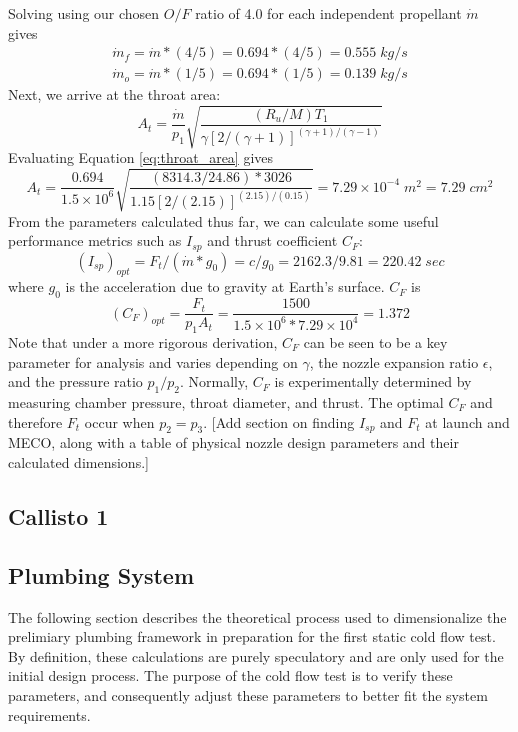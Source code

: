 \documentclass[9pt]{article} %
\numberwithin{equation}{section} %
\begin{document}
Solving using our chosen $O/F$ ratio of 4.0 for each independent propellant $\dot{m}$ gives
\begin{align*} 
\dot{m}_{f} = \dot{m} * (4/5) = 0.694 * (4/5) = 0.555 \; kg/s \\
\dot{m}_{o} = \dot{m} * (1/5) = 0.694 * (1/5) = 0.139 \; kg/s
\end{align*}
Next, we arrive at the throat area:
\begin{equation} \label{eq:throat_area}
A_{t} = \frac{\dot{m}}{p_{1}} \sqrt{ \frac{(R_{u}/M)T_{1}}{\gamma [2/(\gamma + 1)]^{(\gamma + 1)/(\gamma - 1)}} }
\end{equation}
Evaluating Equation \ref{eq:throat_area} gives
\begin{equation*} 
A_{t} = \frac{0.694}{1.5 \times 10^{6}} \sqrt{ \frac{(8314.3/24.86) * 3026}{1.15 [2/(2.15)]^{(2.15)/(0.15)}} } = 7.29 \times 10^{-4} \; m^{2} = 7.29 \; cm^{2}
\end{equation*}
From the parameters calculated thus far, we can calculate some useful performance metrics such as $I_{sp}$ and thrust coefficient $C_{F}$:
\begin{equation} \label{eq:specific_impulse}
(I_{sp})_{opt} = F_{t}/(\dot{m} * g_{0}) = c/g_{0} = 2162.3/9.81 = 220.42 \; sec
\end{equation}
where $g_{0}$ is the acceleration due to gravity at Earth's surface. $C_{F}$ is
\begin{equation} \label{eq:thrust_coefficient}
(C_{F})_{opt} = \frac{F_{t}}{p_{1}A_{t}} = \frac{1500}{1.5 \times 10^{6} * 7.29 \times 10 ^{4}} = 1.372
\end{equation}
Note that under a more rigorous derivation, $C_{F}$ can be seen to be a key parameter for analysis and varies depending on $\gamma$, the nozzle expansion ratio $\epsilon$, and the pressure ratio $p_{1}/p_{2}$. Normally, $C_{F}$ is experimentally determined by measuring chamber pressure, throat diameter, and thrust. The optimal $C_{F}$ and therefore $F_{t}$ occur when $p_{2} = p_{3}$.
[Add section on finding $I_{sp}$ and $F_{t}$ at launch and MECO, along with a table of physical nozzle design parameters and their calculated dimensions.]

\subsection{Callisto 1}

\subsection{Plumbing System}
The following section describes the theoretical process used to dimensionalize the prelimiary plumbing framework in preparation for the first static cold flow test. By definition, these calculations are purely speculatory and are only used for the initial design process. The purpose of the cold flow test is to verify these parameters, and consequently adjust these parameters to better fit the system requirements.
\end{document}
